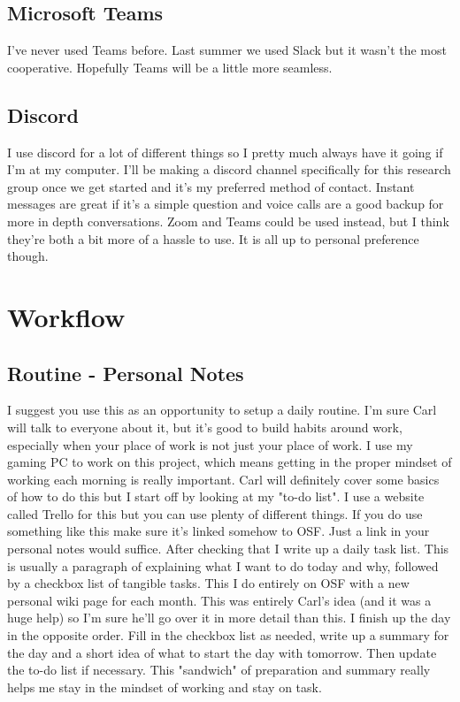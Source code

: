 \documentclass[prb,preprint]{revtex4-1}
\begin{document}
\subsection{Microsoft Teams}
I've never used Teams before. Last summer we used Slack but it wasn't the most cooperative. Hopefully Teams will be a little more seamless.

\subsection{Discord}
I use discord for a lot of different things so I pretty much always have it going if I'm at my computer. I'll be making a discord channel specifically for this research group once we get started and it's my preferred method of contact. Instant messages are great if it's a simple question and voice calls are a good backup for more in depth conversations. Zoom and Teams could be used instead, but I think they're both a bit more of a hassle to use. It is all up to personal preference though.

\section{Workflow}

\subsection{Routine - Personal Notes}
I suggest you use this as an opportunity to setup a daily routine. I'm sure Carl will talk to everyone about it, but it's good to build habits around work, especially when your place of work is not just your place of work. I use my gaming PC to work on this project, which means getting in the proper mindset of working each morning is really important. Carl will definitely cover some basics of how to do this but I start off by looking at my "to-do list". I use a website called Trello for this but you can use plenty of different things. If you do use something like this make sure it's linked somehow to OSF. Just a link in your personal notes would suffice. After checking that I write up a daily task list. This is usually a paragraph of explaining what I want to do today and why, followed by a checkbox list of tangible tasks. This I do entirely on OSF with a new personal wiki page for each month. This was entirely Carl's idea (and it was a huge help) so I'm sure he'll go over it in more detail than this. I finish up the day in the opposite order. Fill in the checkbox list as needed, write up a summary for the day and a short idea of what to start the day with tomorrow. Then update the to-do list if necessary. This "sandwich" of preparation and summary really helps me stay in the mindset of working and stay on task.
\end{document}
